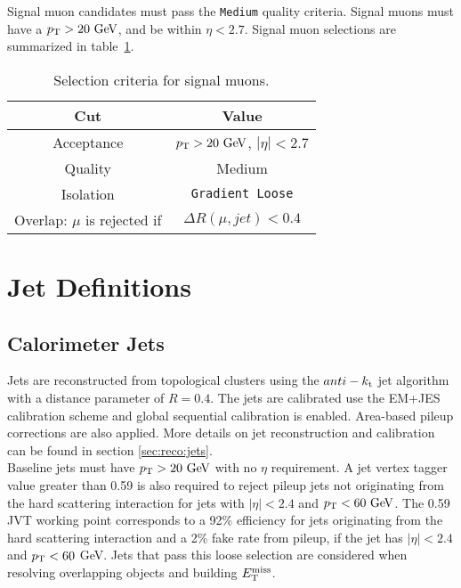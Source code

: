 \indent Signal muon candidates must pass the {\tt Medium} quality criteria.  Signal muons must have a $\pT > 20 \gev$, and be within $\eta < 2.7$.  Signal muon selections are summarized in table~\ref{tb:muons:signal}. \\  

\begin{table}[htp]
  \begin{center}
    \begin{tabular}{c|c} \hline \hline
      Cut & Value \\ \hline \hline
      Acceptance & $\pT > 20\gev$, $|\eta| < 2.7$ \\ \hline
      Quality & Medium \\ \hline
      Isolation & {\tt Gradient Loose} \\ \hline
      Overlap: $\mu$ is rejected if &  $ \Delta R(\mu,jet) < 0.4 $ \\ \hline
      \hline
    \end{tabular}
  \caption{Selection criteria for signal muons.} 
  \end{center}
  \label{tb:muons:signal}
\end{table}%

\section{Jet Definitions}
\subsection{Calorimeter Jets}
\label{sec:def:jets}

\indent Jets are reconstructed from topological clusters using the $anti-k_{\rm{t}}$ jet algorithm~\cite{antikt} with a distance parameter of $R = 0.4$.  The jets are calibrated use the EM+JES calibration scheme and global sequential calibration is enabled. Area-based pileup corrections are also applied. More details on jet reconstruction and calibration can be found in section \ref{sec:reco:jets}. \\
  
\indent Baseline jets must have $\pT > 20\gev$ with no $\eta$ requirement. A jet vertex tagger value greater than 0.59 is also required to reject pileup jets not originating from the hard scattering interaction for jets with $|\eta|<2.4$ and $\pt < 60 \gev$.  The 0.59 JVT working point corresponds to a 92\% efficiency for jets originating from the hard scattering interaction and a 2\% fake rate from pileup, if the jet has $|\eta|<2.4$ and $p_{\mathrm{T}}<60$ GeV. Jets that pass this loose selection are considered when resolving overlapping objects and building $E_{\mathrm{T}}^{\mathrm{miss}}$.  \\

